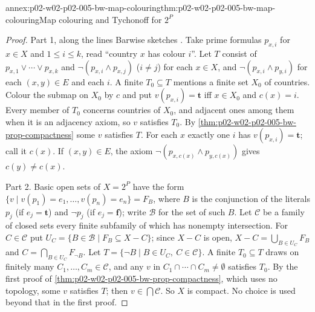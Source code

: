 \begin{annexitem}{annex:p02-w02-p02-005-bw-map-colouring}{thm:p02-w02-p02-005-bw-map-colouring}{Map colouring and Tychonoff for \(2^P\)}
\begin{proof}
Part 1, along the lines Barwise sketches \cite[ch.~A.1, \S4, p.~28]{Barwise1977FirstOrder}.
Take prime formulas \(p_{x,i}\) for \(x\in X\) and \(1\leq i\leq k\),
read ``country \(x\) has colour \(i\)''.  Let \(T\) consist of
\(p_{x,1}\lor\cdots\lor p_{x,k}\) and \(\neg(p_{x,i}\land p_{x,j})\)
(\(i\neq j\)) for each \(x\in X\), and \(\neg(p_{x,i}\land p_{y,i})\) for
each \((x,y)\in E\) and each \(i\).  A finite \(T_0\subseteq T\) mentions a
finite set \(X_0\) of countries.  Colour the submap on \(X_0\) by \(c\) and
put \(v(p_{x,i})=\mathbf t\) iff \(x\in X_0\) and \(c(x)=i\).  Every member
of \(T_0\) concerns countries of \(X_0\), and adjacent ones among them when
it is an adjacency axiom, so \(v\) satisfies \(T_0\).  By
\cref{thm:p02-w02-p02-005-bw-prop-compactness} some \(v\) satisfies \(T\).
For each \(x\) exactly one \(i\) has \(v(p_{x,i})=\mathbf t\); call it
\(c(x)\).  If \((x,y)\in E\), the axiom
\(\neg(p_{x,c(x)}\land p_{y,c(x)})\) gives \(c(y)\neq c(x)\).

Part 2.  Basic open sets of \(X=2^P\) have the form
\(\{v\mid v(p_1)=e_1,\ldots,v(p_n)=e_n\}=F_B\), where \(B\) is the conjunction
of the literals \(p_j\) (if \(e_j=\mathbf t\)) and \(\neg p_j\) (if
\(e_j=\mathbf f\)); write \(\mathcal B\) for the set of such \(B\).  Let
\(\mathcal C\) be a family of closed sets every finite subfamily of which
has nonempty intersection.  For \(C\in\mathcal C\) put
\(U_C=\{B\in\mathcal B\mid F_B\subseteq X-C\}\); since \(X-C\) is open,
\(X-C=\bigcup_{B\in U_C}F_B\) and \(C=\bigcap_{B\in U_C}F_{\neg B}\).  Let
\(T=\{\neg B\mid B\in U_C,\ C\in\mathcal C\}\).  A finite \(T_0\subseteq T\)
draws on finitely many \(C_1,\ldots,C_m\in\mathcal C\), and any \(v\) in
\(C_1\cap\cdots\cap C_m\neq\emptyset\) satisfies \(T_0\).  By the first
proof of \cref{thm:p02-w02-p02-005-bw-prop-compactness}, which uses no
topology, some \(v\) satisfies \(T\); then \(v\in\bigcap\mathcal C\).  So
\(X\) is compact.  No choice is used beyond that in the first proof.
\end{proof}
\end{annexitem}

